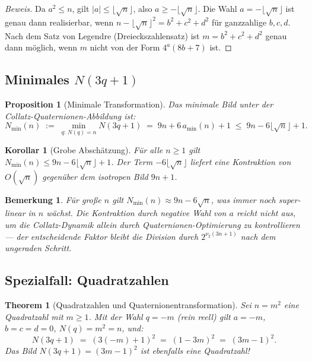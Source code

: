 \documentclass[12pt,a4paper]{article}
\newtheorem{proposition}[definition]{Proposition}
\newtheorem{theorem}[definition]{Theorem}
\newtheorem{korollar}[definition]{Korollar}
\newtheorem{bemerkung}[definition]{Bemerkung}
\newenvironment{beweis}{\begin{proof}[Beweis]}{\end{proof}}
\newcommand{\vii}{\nu_2}
\begin{document}
\begin{beweis}
Da $a^2 \leq n$, gilt $|a| \leq \lfloor\sqrt{n}\rfloor$, also $a \geq -\lfloor\sqrt{n}\rfloor$.
Die Wahl $a = -\lfloor\sqrt{n}\rfloor$ ist genau dann realisierbar, wenn
$n - \lfloor\sqrt{n}\rfloor^2 = b^2+c^2+d^2$ für ganzzahlige $b,c,d$.
Nach dem Satz von Legendre (Dreieckszahlensatz) ist $m = b^2+c^2+d^2$ genau
dann möglich, wenn $m$ nicht von der Form $4^a(8b+7)$ ist.
\end{beweis}

\subsection{Minimales \texorpdfstring{$N(3q+1)$}{N(3q+1)}}

\begin{proposition}[Minimale Transformation]
\label{prop:minimal}
Das minimale Bild unter der Collatz-Quaternionen-Abbildung ist:
\[
  N_{\min}(n) \;:=\; \min_{q:\,N(q)=n} N(3q+1)
             \;=\; 9n + 6\,a_{\min}(n) + 1
             \;\leq\; 9n - 6\lfloor\sqrt{n}\rfloor + 1.
\]
\end{proposition}

\begin{korollar}[Grobe Abschätzung]
Für alle $n \geq 1$ gilt $N_{\min}(n) \leq 9n - 6\lfloor\sqrt{n}\rfloor + 1$.
Der Term $-6\lfloor\sqrt{n}\rfloor$ liefert eine Kontraktion von $O(\sqrt{n})$
gegenüber dem isotropen Bild $9n+1$.
\end{korollar}

\begin{bemerkung}
Für große $n$ gilt $N_{\min}(n) \approx 9n - 6\sqrt{n}$, was immer noch
super-linear in $n$ wächst. Die Kontraktion durch negative Wahl von $a$
reicht nicht aus, um die Collatz-Dynamik allein durch Quaternionen-Optimierung
zu kontrollieren --- der entscheidende Faktor bleibt die Division durch
$2^{\vii(3n+1)}$ nach dem ungeraden Schritt.
\end{bemerkung}

\subsection{Spezialfall: Quadratzahlen}

\begin{theorem}[Quadratzahlen und Quaternionentransformation]
\label{thm:quadratzahlen}
Sei $n = m^2$ eine Quadratzahl mit $m \geq 1$. Mit der Wahl $q = -m$ (rein reell)
gilt $a = -m$, $b = c = d = 0$, $N(q) = m^2 = n$, und:
\[
  N(3q + 1) \;=\; (3(-m) + 1)^2 \;=\; (1 - 3m)^2 \;=\; (3m-1)^2.
\]
Das Bild $N(3q+1) = (3m-1)^2$ ist ebenfalls eine Quadratzahl!
\end{theorem}
\end{document}
